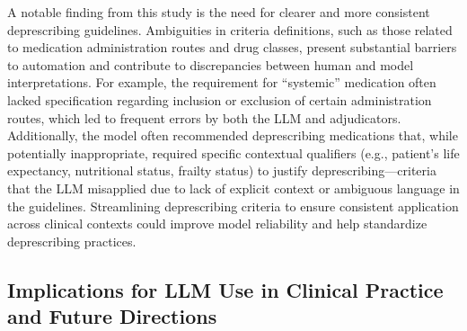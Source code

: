 A notable finding from this study is the need for clearer and more consistent deprescribing guidelines. Ambiguities in criteria definitions, such as those related to medication administration routes and drug classes, present substantial barriers to automation and contribute to discrepancies between human and model interpretations. For example, the requirement for “systemic” medication often lacked specification regarding inclusion or exclusion of certain administration routes, which led to frequent errors by both the LLM and adjudicators. Additionally, the model often recommended deprescribing medications that, while potentially inappropriate, required specific contextual qualifiers (e.g., patient’s life expectancy, nutritional status, frailty status) to justify deprescribing—criteria that the LLM misapplied due to lack of explicit context or ambiguous language in the guidelines. Streamlining deprescribing criteria to ensure consistent application across clinical contexts could improve model reliability and help standardize deprescribing practices. 

\subsection{Implications for LLM Use in Clinical Practice and Future Directions}

